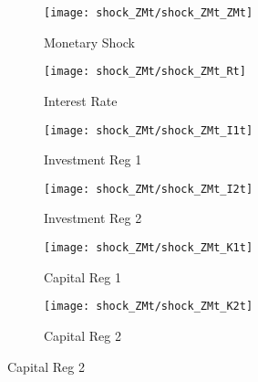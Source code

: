 \documentclass[../thesis.tex]{subfiles}
\begin{document}
	\begin{figure}[h!]
		\centering


		\begin{subfigure}[b]{0.3\textwidth}
			\centering
			\texttt{[image: shock\_ZMt/shock\_ZMt\_ZMt]}
			\caption{\footnotesize Monetary Shock}
			\label{fig:ZMt-ZMt}
		\end{subfigure}
		\hfill
		\begin{subfigure}[b]{0.3\textwidth}
			\centering
			\texttt{[image: shock\_ZMt/shock\_ZMt\_Rt]}
			\caption{\footnotesize Interest Rate}
			\label{fig:ZMt-Rt}
		\end{subfigure}
		\hfill
		\begin{subfigure}[b]{0.3\textwidth}
			\centering
			\texttt{[image: shock\_ZMt/shock\_ZMt\_I1t]}
			\caption{\footnotesize Investment Reg 1}
			\label{fig:ZMt-I1t}
		\end{subfigure}
		\hfill		
		\vspace*{0.5cm}

		
		\begin{subfigure}[b]{0.3\textwidth}
			\centering
			\texttt{[image: shock\_ZMt/shock\_ZMt\_I2t]}
			\caption{\footnotesize Investment Reg 2}
			\label{fig:ZMt-I2t}
		\end{subfigure}
		\hfill
		\begin{subfigure}[b]{0.3\textwidth}
			\centering
			\texttt{[image: shock\_ZMt/shock\_ZMt\_K1t]}
			\caption{\footnotesize Capital Reg 1}
			\label{fig:ZMt-K1t}
		\end{subfigure}
		\hfill
		\begin{subfigure}[b]{0.3\textwidth}
			\centering
			\texttt{[image: shock\_ZMt/shock\_ZMt\_K2t]}
			\caption{\footnotesize Capital Reg 2}
			\label{fig:ZMt-K2t}
		\end{subfigure}
		\hfill
		\vspace*{0.5cm}

		

\end{figure}
\end{document}
